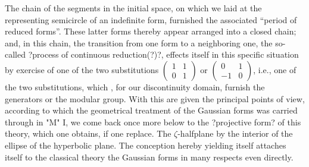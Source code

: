 The chain of the segments in the initial space, on which we laid at the representing semicircle of an indefinite form, furnished the associated “period of reduced forms”. These latter forms thereby appear arranged into a closed chain; and, in this chain, the transition from one form to a neighboring one, the so-called ?process of continuous reduction(?)?, effects itself in this specific situation by exercise of one of the two substitutions $\left(\begin{array}{cc}1 & 1\\0 & 1\end{array}\right)$ or $\left(\begin{array}{cc}0 & 1\\-1 & 0\end{array}\right)$, i.e., one of the two substitutions, which , for our discontinuity domain, furnish the generators or the modular group.
With this are given the principal points of view, according to which the geometrical treatment of the Gaussian forms was carried through in "M" I, we come back once more below to the ?projective form? of this theory, which one obtains, if one replace. The $\zeta$-halfplane by the interior of the ellipse of the hyperbolic plane. The conception hereby yielding itself attaches itself to the classical theory the Gaussian forms in many respects even directly.